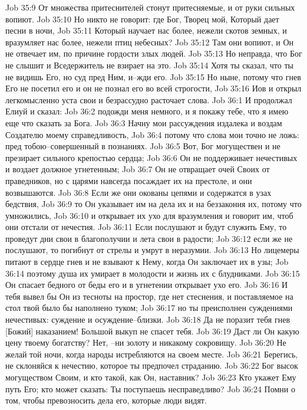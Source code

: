 Job 35:9  От множества притеснителей стонут притесняемые, и от руки сильных вопиют.
Job 35:10  Но никто не говорит: где Бог, Творец мой, Который дает песни в ночи,
Job 35:11  Который научает нас более, нежели скотов земных, и вразумляет нас более, нежели птиц небесных?
Job 35:12  Там они вопиют, и Он не отвечает им, по причине гордости злых людей.
Job 35:13  Но неправда, что Бог не слышит и Вседержитель не взирает на это.
Job 35:14  Хотя ты сказал, что ты не видишь Его, но суд пред Ним, и--жди его.
Job 35:15  Но ныне, потому что гнев Его не посетил его и он не познал его во всей строгости,
Job 35:16  Иов и открыл легкомысленно уста свои и безрассудно расточает слова.
Job 36:1  И продолжал Елиуй и сказал:
Job 36:2  подожди меня немного, и я покажу тебе, что я имею еще что сказать за Бога.
Job 36:3  Начну мои рассуждения издалека и воздам Создателю моему справедливость,
Job 36:4  потому что слова мои точно не ложь: пред тобою--совершенный в познаниях.
Job 36:5  Вот, Бог могуществен и не презирает сильного крепостью сердца;
Job 36:6  Он не поддерживает нечестивых и воздает должное угнетенным;
Job 36:7  Он не отвращает очей Своих от праведников, но с царями навсегда посаждает их на престоле, и они возвышаются.
Job 36:8  Если же они окованы цепями и содержатся в узах бедствия,
Job 36:9  то Он указывает им на дела их и на беззакония их, потому что умножились,
Job 36:10  и открывает их ухо для вразумления и говорит им, чтоб они отстали от нечестия.
Job 36:11  Если послушают и будут служить Ему, то проведут дни свои в благополучии и лета свои в радости;
Job 36:12  если же не послушают, то погибнут от стрелы и умрут в неразумии.
Job 36:13  Но лицемеры питают в сердце гнев и не взывают к Нему, когда Он заключает их в узы;
Job 36:14  поэтому душа их умирает в молодости и жизнь их с блудниками.
Job 36:15  Он спасает бедного от беды его и в угнетении открывает ухо его.
Job 36:16  И тебя вывел бы Он из тесноты на простор, где нет стеснения, и поставляемое на стол твой было бы наполнено туком;
Job 36:17  но ты преисполнен суждениями нечестивых: суждение и осуждение--близки.
Job 36:18  Да не поразит тебя гнев [Божий] наказанием! Большой выкуп не спасет тебя.
Job 36:19  Даст ли Он какую цену твоему богатству? Нет, --ни золоту и никакому сокровищу.
Job 36:20  Не желай той ночи, когда народы истребляются на своем месте.
Job 36:21  Берегись, не склоняйся к нечестию, которое ты предпочел страданию.
Job 36:22  Бог высок могуществом Своим, и кто такой, как Он, наставник?
Job 36:23  Кто укажет Ему путь Его; кто может сказать: Ты поступаешь несправедливо?
Job 36:24  Помни о том, чтобы превозносить дела его, которые люди видят.
